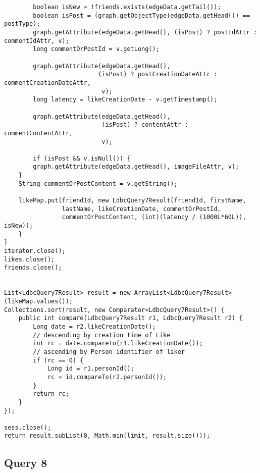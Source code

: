 {\begin{verbatim}
        boolean isNew = !friends.exists(edgeData.getTail());
        boolean isPost = (graph.getObjectType(edgeData.getHead()) == postType);
        graph.getAttribute(edgeData.getHead(), (isPost) ? postIdAttr : commentIdAttr, v);
        long commentOrPostId = v.getLong();

        graph.getAttribute(edgeData.getHead(), 
                          (isPost) ? postCreationDateAttr : commentCreationDateAttr, 
                           v);
        long latency = likeCreationDate - v.getTimestamp();

        graph.getAttribute(edgeData.getHead(), 
                           (isPost) ? contentAttr : commentContentAttr,
                           v);

        if (isPost && v.isNull()) {
        graph.getAttribute(edgeData.getHead(), imageFileAttr, v);
    }
    String commentOrPostContent = v.getString();

    likeMap.put(friendId, new LdbcQuery7Result(friendId, firstName,
                lastName, likeCreationDate, commentOrPostId,
                commentOrPostContent, (int)(latency / (1000L*60L)), isNew));
    }
}
iterator.close();
likes.close();
friends.close();


List<LdbcQuery7Result> result = new ArrayList<LdbcQuery7Result>(likeMap.values());
Collections.sort(result, new Comparator<LdbcQuery7Result>() {
    public int compare(LdbcQuery7Result r1, LdbcQuery7Result r2) {
        Long date = r2.likeCreationDate();
        // descending by creation time of Like
        int rc = date.compareTo(r1.likeCreationDate()); 
        // ascending by Person identifier of liker
        if (rc == 0) {
            Long id = r1.personId();
            rc = id.compareTo(r2.personId());
        }
        return rc;
    }
});

sess.close();
return result.subList(0, Math.min(limit, result.size()));

\end{verbatim}
}

\subsection{Query 8}

